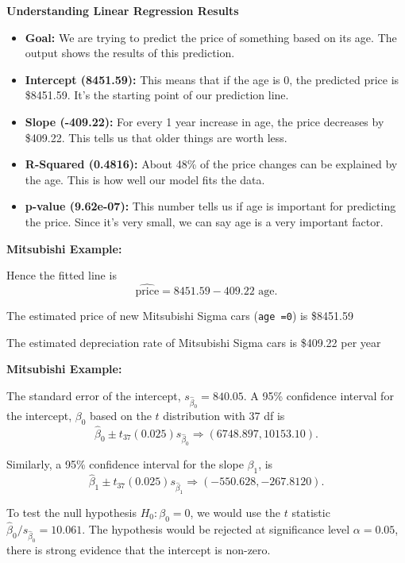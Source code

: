 \documentclass[landscape]{slides}
\newcommand{\heading}[1]{%
  \begin{center}
    \large\bf \color{red}
        #1
  \end{center}
  \vspace{1ex minus 1ex}}
\begin{document}
\begin{slide}
	\heading{Understanding Linear Regression Results}
	\begin{itemize}
		\item \textbf{Goal:} We are trying to predict the price of something based on its age. The output shows the results of this prediction.
		
		\item \textbf{Intercept (8451.59):} This means that if the age is 0, the predicted price is \$8451.59. It's the starting point of our prediction line.
		
		\item \textbf{Slope (-409.22):} For every 1 year increase in age, the price decreases by \$409.22. This tells us that older things are worth less.
		
		
		\item \textbf{R-Squared (0.4816):} About 48\% of the price changes can be explained by the age. This is how well our model fits the data.
		
		\item \textbf{p-value (9.62e-07):} This number tells us if age is important for predicting the price. Since it's very small, we can say age is a very important factor.
		
	\end{itemize}
\end{slide}


\begin{slide}
\heading{Mitsubishi Example:}

Hence the fitted line is 
$$\hat{\mbox{price}}=8451.59-409.22 \mbox{ age}.$$

The estimated price of new Mitsubishi Sigma cars ({\tt age =0}) is \$8451.59

The estimated depreciation rate of Mitsubishi Sigma cars is \$409.22 per year

\end{slide}
 

\begin{slide}
	\heading{Mitsubishi Example:}
	 
	
	The standard error of the intercept, $s_{\hat{\beta}_0}=840.05$. A 95\% confidence
	interval for the intercept, $\beta_0$ based on the $t$ distribution with 37 df is
	$$\hat{\beta}_0\pm t_{37}(0.025)s_{\hat{\beta}_0} \Longrightarrow (6748.897, 10153.10).$$
 
	Similarly, a 95\% confidence interval for the slope $\beta_1$, is
	$$\hat{\beta}_1\pm t_{37}(0.025)s_{\hat{\beta}_1} \Longrightarrow (-550.628, -267.8120).$$
	
	To test the null hypothesis $H_0:\beta_0=0$, we would use the $t$ statistic
	$\hat{\beta}_0/s_{\hat{\beta}_0}=10.061$. The hypothesis would be rejected at significance level
	$\alpha=0.05$, there is strong evidence that the intercept is non-zero.
	
 
	
\end{slide}
\end{document}
